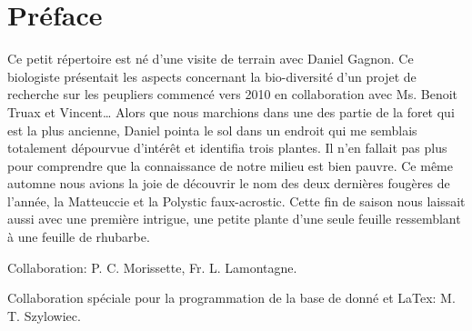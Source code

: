 \chapter*{Préface}

Ce petit répertoire est né d'une visite
de terrain avec Daniel Gagnon. Ce biologiste
présentait les aspects concernant la bio-diversité
d'un projet de recherche sur les peupliers commencé
vers 2010 en collaboration avec Ms. Benoit Truax
et Vincent\ldots
Alors que nous marchions dans
une des partie de la foret qui est la plus ancienne,
Daniel pointa le sol dans un endroit qui me semblais
totalement dépourvue d'intérêt et identifia trois plantes.
Il n'en fallait pas plus pour comprendre que
la connaissance de notre milieu est bien pauvre.
Ce même automne nous avions la joie de découvrir
le nom des deux dernières fougères de l'année,
la Matteuccie et la Polystic faux-acrostic.
Cette fin de saison nous laissait aussi avec
une première intrigue, une petite plante d'une seule feuille ressemblant à une feuille de rhubarbe. 
	
Collaboration:
P. C. Morissette,
Fr. L. Lamontagne.
	
Collaboration spéciale pour la programmation
de la base de donné et LaTex:
M. T. Szylowiec.
